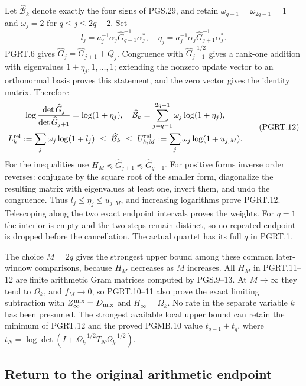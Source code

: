 Let $\widehat{\mathcal B}_k$ denote exactly the four signs of PGS.29,
and retain $\omega_{q-1}=\omega_{2q-1}=1$ and $\omega_j=2$
for $q\leq j\leq2q-2$. Set
\[
 l_j=a_j^{-1}\alpha_j\widehat G_{q-1}^{-1}\alpha_j^*,
 \quad\eta_j=a_j^{-1}\alpha_j\widehat G_{j+1}^{-1}\alpha_j^*.
\]
PGRT.6 gives $\widehat G_j=\widehat G_{j+1}+Q_j$.
Congruence with $\widehat G_{j+1}^{-1/2}$ gives a rank-one
addition with eigenvalues $1+\eta_j,1,\ldots,1$; extending the
nonzero update vector to an orthonormal basis proves this statement,
and the zero vector gives the identity matrix. Therefore
\[
\begin{gathered}
 \log\frac{\det\widehat G_j}{\det\widehat G_{j+1}}
       =\log(1+\eta_j),\quad
 \widehat{\mathcal B}_k=
                  \sum_{j=q-1}^{2q-1}\omega_j\log(1+\eta_j),\\
 L_k^{\rm rel}:=\sum_j\omega_j\log(1+l_j)
 \ \leq\ \widehat{\mathcal B}_k\ \leq\
 U_{k,M}^{\rm rel}:=\sum_j\omega_j\log(1+u_{j,M}).
\end{gathered}
\tag{PGRT.12}\label{eq:pgrt-endpoint-bounds}
\]
For the inequalities use
$H_M\preceq\widehat G_{j+1}\preceq\widehat G_{q-1}$.
For positive forms inverse order reverses: conjugate by the square
root of the smaller form, diagonalize the resulting matrix with
eigenvalues at least one, invert them, and undo the congruence.
Thus $l_j\leq\eta_j\leq u_{j,M}$, and increasing logarithms
prove PGRT.12. Telescoping along the two exact endpoint intervals
proves the weights. For $q=1$ the interior is empty and the two
steps remain distinct, so no repeated endpoint is dropped before
the cancellation. The actual quartet has its full $q$ in PGRT.1.

The choice $M=2q$ gives the strongest upper bound among these
common later-window comparisons, because $H_M$ decreases as $M$
increases. All $H_M$ in PGRT.11--12 are finite arithmetic Gram
matrices computed by PGS.9--13. At $M\to\infty$ they tend to
$\Omega_k$, and $f_M\to0$, so PGRT.10--11 also prove the exact
limiting subtraction with $Z_\infty^{\rm mix}=D_{\rm mix}$ and
$H_\infty=\Omega_k$. No rate in the separate variable $k$ has
been presumed. The strongest available local upper bound can
retain the minimum of PGRT.12 and the proved PGMB.10 value
$t_{q-1}+t_q$, where $t_N=\log\det(I+\Omega_k^{-1/2}T_N\Omega_k^{-1/2})$.

\subsection{Return to the original arithmetic endpoint}

